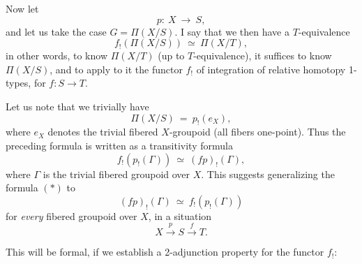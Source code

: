 Now let
\[ p :\ X \ \longrightarrow\ S, \]
and let us take the case $G = \Pi(X/S)$. I say that we then have a $T$-equivalence
\[ \boxed{\ f_!(\Pi(X/S)) \ \simeq\ \Pi(X/T),\ } \tag*{$(*)$} \]
in other words, to know $\Pi(X/T)$ (up to $T$-equivalence), it suffices to know $\Pi(X/S)$, and to apply to it the functor $f_!$ of integration of relative homotopy 1-types, for $f : S \longrightarrow T$.

Let us note that we trivially have
\[ \Pi(X/S) \ =\ p_!(e_X), \]
where $e_X$ denotes the trivial fibered $X$-groupoid (all fibers one-point). Thus the preceding formula is written as a transitivity formula
\[ f_!(p_!(\Gamma)) \ \simeq\ (fp)_!(\Gamma), \]
where $\Gamma$ is the trivial fibered groupoid over $X$. This suggests generalizing the formula $(*)$ to
\[ \boxed{\ (fp)_!(\Gamma) \ \simeq\ f_!(p_!(\Gamma))\ } \]
for \textit{every} fibered groupoid over $X$, in a situation
\[ X \xrightarrow{\ p\ } S \xrightarrow{\ f\ } T. \]

This will be formal, if we establish a 2-adjunction property for the functor $f_!$: